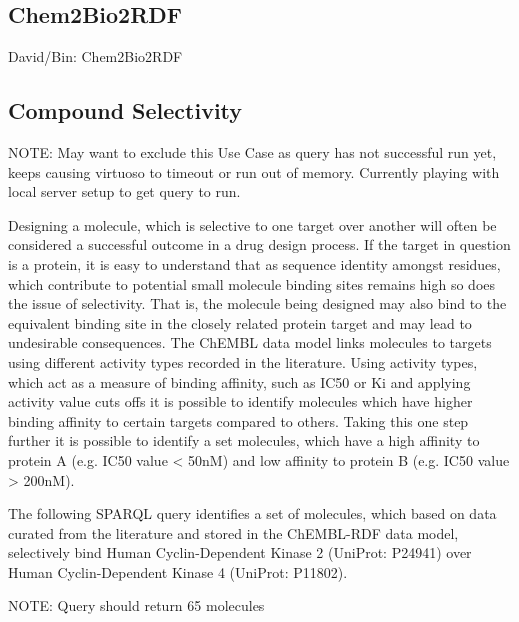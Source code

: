\documentclass[10pt]{bmc_article}
\newenvironment{bmcformat}{\begin{raggedright}\baselineskip20pt\sloppy\setboolean{publ}{false}}{\end{raggedright}\baselineskip20pt\sloppy}
\begin{document}
\begin{bmcformat}
\subsection*{Chem2Bio2RDF}

David/Bin: Chem2Bio2RDF

\subsection*{Compound Selectivity}

NOTE: May want to exclude this Use Case as query has not successful run yet, keeps causing virtuoso 
to timeout or run out of memory. Currently playing with local server setup to get query to run.

Designing a molecule, which is selective to one target over another will often be considered a 
successful outcome in a drug design process. If the target in question is a protein, it is easy
to understand that as sequence identity amongst residues, which contribute to potential small 
molecule binding sites remains high so does the issue of selectivity. That is, the molecule being 
designed may also bind to the equivalent binding site in the  closely related protein 
target and may lead to undesirable consequences. The ChEMBL data model links molecules to 
targets using different activity types recorded in the literature. Using activity types, 
which act as a measure of binding affinity, such as IC50 or Ki and applying activity value cuts
offs it is possible to identify molecules which have higher binding affinity to certain targets 
compared to others. Taking this one step further it is possible to identify a set molecules, 
which have a high affinity to protein A (e.g. IC50 value < 50nM) and low affinity to protein 
B (e.g. IC50 value > 200nM). 

The following SPARQL query identifies a set of molecules, which based on data curated from the 
literature and stored in the ChEMBL-RDF data model, selectively bind Human Cyclin-Dependent Kinase 2 
(UniProt: P24941) over Human Cyclin-Dependent Kinase 4 (UniProt: P11802). 

NOTE: Query should return 65 molecules


\end{bmcformat}
\end{document}
